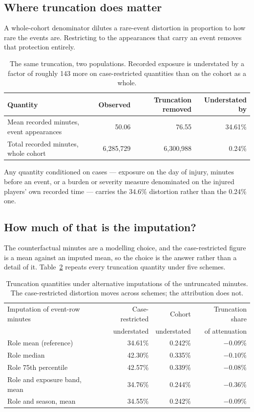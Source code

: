 \documentclass[11pt]{article}
\begin{document}
\subsection*{Where truncation does matter}

A whole-cohort denominator dilutes a rare-event distortion in proportion to how rare the events are. Restricting to the appearances that carry an event removes that protection entirely.

\begin{table}[h]
\centering
\caption{The same truncation, two populations. Recorded exposure is understated by a factor of roughly 143 more on case-restricted quantities than on the cohort as a whole.}
\label{tab:supp_case_restricted}
\small
\begin{tabular}{lrrr}
\toprule
Quantity & Observed & Truncation removed & Understated by\\
\midrule
Mean recorded minutes, event appearances & 50.06 & 76.55 & 34.61\%\\
Total recorded minutes, whole cohort & 6,285,729 & 6,300,988 & 0.24\%\\
\bottomrule
\end{tabular}
\end{table}

Any quantity conditioned on cases --- exposure on the day of injury, minutes before an event, or a burden or severity measure denominated on the injured players' own recorded time --- carries the 34.6\% distortion rather than the 0.24\% one.

\subsection*{How much of that is the imputation?}

The counterfactual minutes are a modelling choice, and the case-restricted figure is a mean against an imputed mean, so the choice is the answer rather than a detail of it. Table~\ref{tab:supp_imputation} repeats every truncation quantity under five schemes.

\begin{table}[h]
\centering
\caption{Truncation quantities under alternative imputations of the untruncated minutes. The case-restricted distortion moves across schemes; the attribution does not.}
\label{tab:supp_imputation}
\small
\begin{tabular}{lrrr}
\toprule
Imputation of event-row minutes & Case-restricted & Cohort & Truncation share\\
 & understated & understated & of attenuation\\
\midrule
Role mean (reference) & 34.61\% & 0.242\% & $-0.09\%$\\
Role median & 42.30\% & 0.335\% & $-0.10\%$\\
Role 75th percentile & 42.57\% & 0.339\% & $-0.08\%$\\
Role and exposure band, mean & 34.76\% & 0.244\% & $-0.36\%$\\
Role and season, mean & 34.55\% & 0.242\% & $-0.09\%$\\
\bottomrule
\end{tabular}
\end{table}
\end{document}
